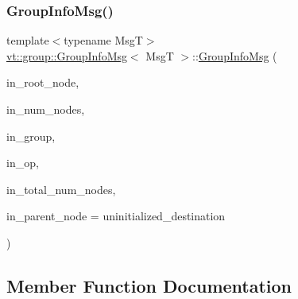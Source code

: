 \mbox{\label{structvt_1_1group_1_1_group_info_msg_a8d7363206ca034b3f3f45b790c6ecf35}} 
\subsubsection{\texorpdfstring{Group\+Info\+Msg()}{GroupInfoMsg()}\hspace{0.1cm}{\footnotesize\ttfamily [2/2]}}
{\footnotesize\ttfamily template$<$typename MsgT$>$ \\
\hyperlink{structvt_1_1group_1_1_group_info_msg}{vt\+::group\+::\+Group\+Info\+Msg}$<$ MsgT $>$\+::\hyperlink{structvt_1_1group_1_1_group_info_msg}{Group\+Info\+Msg} (\begin{DoxyParamCaption}\item[{\hyperlink{namespacevt_a866da9d0efc19c0a1ce79e9e492f47e2}{Node\+Type} const \&}]{in\+\_\+root\+\_\+node,  }\item[{\hyperlink{namespacevt_a866da9d0efc19c0a1ce79e9e492f47e2}{Node\+Type} const \&}]{in\+\_\+num\+\_\+nodes,  }\item[{\hyperlink{namespacevt_a27b5e4411c9b6140c49100e050e2f743}{Group\+Type} const \&}]{in\+\_\+group,  }\item[{\hyperlink{namespacevt_1_1group_a73f2624ddeb535b39a08b6524f26b244}{Remote\+Operation\+I\+D\+Type}}]{in\+\_\+op,  }\item[{\hyperlink{namespacevt_a866da9d0efc19c0a1ce79e9e492f47e2}{Node\+Type} const \&}]{in\+\_\+total\+\_\+num\+\_\+nodes,  }\item[{\hyperlink{namespacevt_a866da9d0efc19c0a1ce79e9e492f47e2}{Node\+Type} const \&}]{in\+\_\+parent\+\_\+node = {\ttfamily uninitialized\+\_\+destination} }\end{DoxyParamCaption})\hspace{0.3cm}{\ttfamily [inline]}}



\subsection{Member Function Documentation}
\mbox{\label{structvt_1_1group_1_1_group_info_msg_af2b70c6fd25cf88a0901498fab9cf5a3}} 
